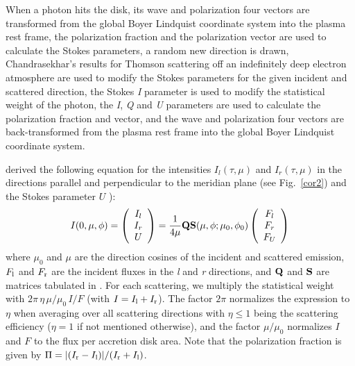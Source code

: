 \documentclass[manuscript]{aastex}
\begin{document}
When a photon hits the disk, its wave and polarization four vectors are transformed from the global Boyer Lindquist coordinate system into the plasma rest frame, the polarization fraction and the polarization vector are used to calculate the Stokes parameters, a random new direction is drawn, Chandrasekhar's results for Thomson scattering off an indefinitely deep electron atmosphere are used to modify the Stokes parameters for the given incident and scattered direction, the Stokes {\it I} parameter is used to modify the statistical weight of the photon, the {\it I}, {\it Q} and {\it U} parameters are used to calculate the polarization fraction and vector, and the wave and polarization four vectors are back-transformed from the plasma rest frame into the global Boyer Lindquist coordinate system.

\citet[]{cha60} derived the following equation for the 
intensities $I_l(\tau,\mu)$ and $I_r(\tau,\mu)$ in the directions parallel
and perpendicular to the meridian plane (see Fig.~\ref{cor2}) 
and the Stokes parameter $U$ \citep[][Chapter 10, Equ. (163)]{cha60}):
\begin{equation}
I(0,\mu,\phi)=\left(
\begin{array}{cc}
I_l \\
I_r \\
U\\
\end{array} \right)=\frac{1}{4\mu}\bold{Q}\bold{S}(\mu,\phi;\mu_0,\phi_0)\left(
\begin{array}{cc}
F_l \\
F_r \\
F_U\\
\end{array} \right)
\end{equation}
where $\mu_0$ and $\mu$ are the direction cosines of the incident and scattered emission, $F_{\rm l}$ and $F_{\rm r}$ are the incident fluxes in the {\it{l}} and {\it{r}} directions, and $\bold{Q}$ and $\bold{S}$ are matrices tabulated in \citet{cha60}.
%
For each scattering, we multiply the statistical weight with 
$2\pi\,\eta\, \mu/\mu_0\,I/F$ (with $I=I_{\rm l}+I_{\rm r}$).
%
The factor $2\pi$ normalizes the expression to $\eta$ when averaging over all scattering directions with $\eta\le 1$ being the scattering efficiency ($\eta=1$ if not mentioned otherwise), and the factor $\mu/\mu_0$ normalizes $I$ and $F$ to the flux per accretion disk area. Note that the polarization fraction is given by $\Pi=|(I_{\rm r}-I_{\rm l})|/(I_{\rm r}+I_{\rm l})$. 
\end{document}
